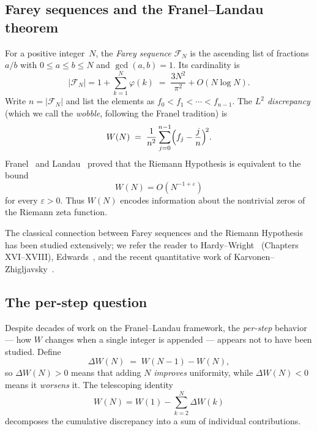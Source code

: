 \documentclass[11pt]{article}
\theoremstyle{definition}
\newcommand{\F}{\mathcal{F}}
\begin{document}
\subsection{Farey sequences and the Franel--Landau theorem}\label{sec:intro-fl}

For a positive integer~$N$, the \emph{Farey sequence} $\F_N$ is the
ascending list of fractions $a/b$ with $0 \le a \le b \le N$ and
$\gcd(a,b) = 1$.  Its cardinality is
\begin{equation}\label{eq:farey-size}
  |\F_N| = 1 + \sum_{k=1}^{N} \varphi(k) \;=\; \frac{3N^2}{\pi^2} + O(N \log N).
\end{equation}
Write $n = |\F_N|$ and list the elements as
$f_0 < f_1 < \cdots < f_{n-1}$.  The \emph{$L^2$ discrepancy} (which we
call the \emph{wobble}, following the Franel tradition) is
\begin{equation}\label{eq:wobble}
  W(N) \;=\; \frac{1}{n^2}\sum_{j=0}^{n-1}
    \Bigl( f_j - \frac{j}{n} \Bigr)^{\!2}.
\end{equation}
Franel~\cite{Franel1924} and Landau~\cite{Landau1924} proved that the
Riemann Hypothesis is equivalent to the bound
\[
  W(N) = O(N^{-1+\varepsilon})
\]
for every $\varepsilon > 0$.  Thus $W(N)$ encodes information about
the nontrivial zeros of the Riemann zeta function.

The classical connection between Farey sequences and the Riemann
Hypothesis has been studied extensively; we refer the reader
to Hardy--Wright~\cite{HardyWright2008} (Chapters XVI--XVIII),
Edwards~\cite{Edwards1974}, and the recent quantitative work of
Karvonen--Zhigljavsky~\cite{KarvonenZhigljavsky2025}.

\subsection{The per-step question}\label{sec:intro-perstep}

Despite decades of work on the Franel--Landau framework, the
\emph{per-step} behavior --- how $W$ changes when a single integer
is appended --- appears not to have been studied.  Define
\begin{equation}\label{eq:delta-w}
  \Delta W(N) \;=\; W(N{-}1) - W(N),
\end{equation}
so $\Delta W(N) > 0$ means that adding $N$ \emph{improves} uniformity,
while $\Delta W(N) < 0$ means it \emph{worsens} it.  The
telescoping identity
\begin{equation}\label{eq:telescope}
  W(N) = W(1) - \sum_{k=2}^{N} \Delta W(k)
\end{equation}
decomposes the cumulative discrepancy into a sum of individual contributions.
\end{document}
